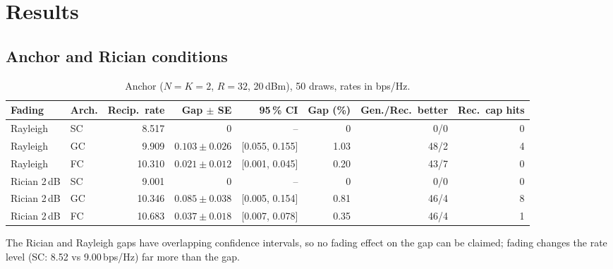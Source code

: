 \documentclass[10pt,a4paper]{article}
\newcommand{\bpsHz}{bps/Hz}
\begin{document}
\section{Results}
\subsection{Anchor and Rician conditions}
\begin{table}[H]\centering\small
\begin{tabular}{@{}llrrrrrr@{}}\toprule
Fading & Arch. & Recip.\ rate & Gap $\pm$ SE & 95\,\% CI & Gap (\%) & Gen./Rec.\ better & Rec.\ cap hits\\\midrule
Rayleigh & SC & 8.517 & 0 & -- & 0 & 0/0 & 0\\
Rayleigh & GC & 9.909 & $0.103\pm0.026$ & [0.055, 0.155] & 1.03 & 48/2 & 4\\
Rayleigh & FC & 10.310 & $0.021\pm0.012$ & [0.001, 0.045] & 0.20 & 43/7 & 0\\\addlinespace
Rician 2\,dB & SC & 9.001 & 0 & -- & 0 & 0/0 & 0\\
Rician 2\,dB & GC & 10.346 & $0.085\pm0.038$ & [0.005, 0.154] & 0.81 & 46/4 & 8\\
Rician 2\,dB & FC & 10.683 & $0.037\pm0.018$ & [0.007, 0.078] & 0.35 & 46/4 & 1\\\bottomrule
\end{tabular}
\caption{Anchor ($N{=}K{=}2$, $R{=}32$, 20\,dBm), 50 draws, rates in \bpsHz.}
\end{table}
The Rician and Rayleigh gaps have overlapping confidence intervals, so no fading effect on the gap can be claimed; fading changes the rate level (SC: 8.52 vs 9.00\,\bpsHz) far more than the gap.
\end{document}
